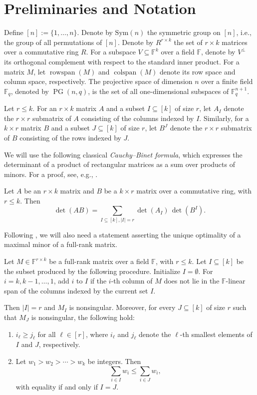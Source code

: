 \documentclass[11pt]{article}
\newcommand{\F}{\mathbb{F}}
\newcommand{\Sym}{\mathrm{Sym}}
\DeclareMathOperator{\rowspan}{rowspan}
\DeclareMathOperator{\colspan}{colspan}
\DeclareMathOperator{\PG}{PG}
\begin{document}
\section{Preliminaries and Notation}

Define $[n] := \{1,\dots,n\}$. 
Denote by $\Sym(n)$ the symmetric group on $[n]$, i.e., the group of all permutations of $[n]$. Denote by $R^{r\times k}$ the set of $r\times k$ matrices over a commutative ring $R$. For a subspace $V\subseteq \F^k$ over a field $\F$, denote by $V^{\perp}$ its orthogonal complement with respect to the standard inner product. For a matrix $M$, let $\rowspan(M)$ and $\colspan(M)$ denote its row space and column space, respectively. The projective space of dimension $n$ over a finite field $\F_q$, denoted by $\PG(n,q)$, is the set of all one-dimensional subspaces of $\F_q^{n+1}$.

Let $r \le k$. For an $r\times k$ matrix $A$ and a subset $I \subseteq [k]$ of size $r$, let $A_I$ denote the $r\times r$ submatrix of $A$ consisting of the columns indexed by $I$. Similarly, for a $k\times r$ matrix $B$ and a subset $J \subseteq [k]$ of size $r$, let $B^J$ denote the $r\times r$ submatrix of $B$ consisting of the rows indexed by $J$.

We will use the following classical \emph{Cauchy--Binet formula}, which expresses the determinant of a product of rectangular matrices as a sum over products of minors. For a proof, see, e.g., \cite[Appendix~B.3]{For14}.

\begin{lemma}\label{lem:CB}
Let $A$ be an $r\times k$ matrix and $B$ be a $k\times r$ matrix over a commutative ring, with $r \le k$. Then
\[
\det(AB)
=
\sum_{I \subseteq [k], |I|=r}
\det(A_I)\,\det(B^I).
\]
\end{lemma}

Following \cite{GR08,FS12}, we will also need a statement asserting the unique optimality of a maximal minor of a full-rank matrix.

\begin{lemma}\label{lem:unique}
Let $M \in \F^{r \times k}$ be a full-rank matrix over a field $\F$, with $r \le k$. 
Let $I \subseteq [k]$ be the subset produced by the following procedure.
Initialize $I = \emptyset$. For $i = k, k-1, \dots, 1$, add $i$ to $I$ if the $i$-th column of $M$ does not lie in the $\F$-linear span of the columns indexed by the current set $I$.

Then $|I| = r$ and $M_I$ is nonsingular. Moreover, for every $J \subseteq [k]$ of size $r$ such that $M_J$ is nonsingular, the following hold:
\begin{enumerate}
\item $i_\ell \ge j_\ell$ for all $\ell \in [r]$, where $i_\ell$ and $j_\ell$ denote the $\ell$-th smallest elements of $I$ and $J$, respectively.
\item Let $w_1 > w_2 > \cdots > w_k$ be integers. Then
\[
\sum_{i \in I} w_i \le \sum_{i \in J} w_i,
\]
with equality if and only if $I = J$.
\end{enumerate}
\end{lemma}
\end{document}
